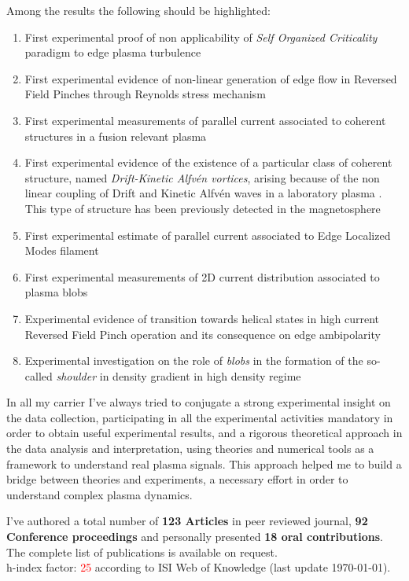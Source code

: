 Among the results the following should be highlighted:
\begin{enumerate}[itemsep=0.05ex, label=\textbf{\roman*}]
\item First experimental proof of non applicability of \emph{Self
    Organized Criticality} paradigm to edge plasma
  turbulence \parencite{Spada:2001p3574,Antoni:2001p3221}
\item First experimental evidence of non-linear generation of edge
  flow in Reversed Field Pinches through Reynolds stress
  mechanism \parencite{Vianello:2005p1976,Vianello:2005p2671}
\item First experimental measurements of parallel current associated
   to coherent structures in a fusion relevant
   plasma \parencite{Spolaore:2009p4115} 
\item First experimental evidence of the existence of a particular 
  class of coherent structure, named \emph{Drift-Kinetic Alfv\'en
    vortices}, arising because of the non linear coupling of Drift and
  Kinetic Alfv\'en waves in a laboratory plasma \parencite{Vianello:2010p4670}. This type of structure has been
  previously detected in the magnetosphere
\item First experimental estimate of parallel current associated to
   Edge Localized Modes filament \parencite{PhysRevLett.106.125002}
\item First experimental measurements of 2D current distribution
associated to plasma blobs \parencite{Furno:2011cs}
\item Experimental evidence of transition towards helical states in
high current Reversed Field Pinch
operation \parencite{Lorenzini:2009p4248} and its consequence on edge
ambipolarity \parencite{Spizzo:2014jn}
\item Experimental investigation on the role of \emph{blobs} in the
  formation of the so-called \emph{shoulder} in density gradient in
  high density regime \parencite{Carralero:prl2015, Vianello:2017ku}
\end{enumerate}
In all my carrier I've always tried to conjugate a strong experimental
insight on the data collection, participating in all the experimental
activities mandatory in order to obtain useful experimental results, and a rigorous theoretical approach in
the data analysis and interpretation, using theories and numerical
tools as a framework to understand real plasma signals. This
approach helped me to build a bridge between theories and experiments,
a necessary effort in order to understand complex plasma dynamics.

I've authored a total number of \textbf{123 Articles} in peer reviewed journal,
\textbf{92 Conference proceedings} and personally presented \textbf{18 oral
contributions}. The complete list of publications is available on
request.  \\
h-index factor: \textcolor{red}{25} according to ISI Web of Knowledge
(last update \today). 


\printbibliography[type=article,  title = {Relevant publications}, heading=subbibliography, prefixnumbers={A}, resetnumbers=true]

